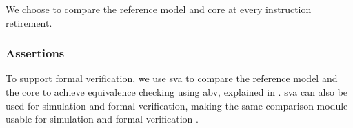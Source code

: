 We choose to compare the reference model and core at every instruction retirement.

%
%
%
%
%


\subsubsection{Assertions}

To support formal verification, we use \acrfull{sva} to compare the reference model and the core to achieve equivalence checking using \acrfull{abv}, explained in . \acrshort{sva} can also be used for simulation and formal verification, making the same comparison module usable for simulation and formal verification \cite{cernySVAPowerAssertions2015}. 

